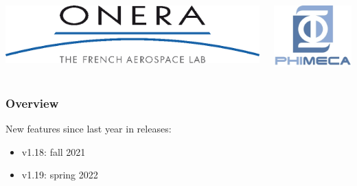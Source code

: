 \documentclass{beamer}
\begin{document}
\begin{frame}
\begin{columns}
  \begin{center}
\includegraphics[height=0.05\textheight]{figures/onera-logo.png}
\end{center}

  \begin{center}
\includegraphics[height=0.08\textheight]{figures/logo-phimeca.png}
\end{center}


  \end{columns}

  \end{frame}

\begin{frame}
\frametitle{Overview}

New features since last year in releases:

\begin{itemize}
\item v1.18: fall 2021
\item v1.19: spring 2022
\end{itemize}



\end{frame}
  
\end{document}

